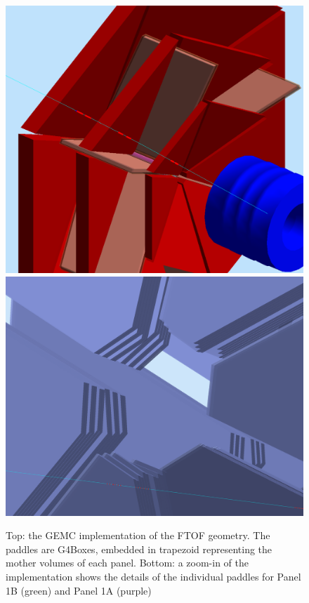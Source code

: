 \begin{figure}
	\centering
	\includegraphics[width=0.95\columnwidth,keepaspectratio]{img/dcGeometry.png}
	\includegraphics[width=0.95\columnwidth,keepaspectratio]{img/dcDetail.png}
	\caption{Top: the GEMC implementation of the FTOF geometry. The paddles are G4Boxes, embedded in trapezoid representing the mother volumes of each panel.
            Bottom: a zoom-in of the implementation shows the details of the individual paddles for Panel 1B (green) and Panel 1A (purple) }
	\label{fig:dcGeometry}
\end{figure}


